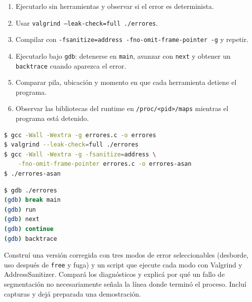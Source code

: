 \documentclass[11pt,a4paper]{article}
\begin{document}
\begin{enumerate}[leftmargin=*]
  \item Ejecutarlo sin herramientas y observar si el error es determinista.
  \item Usar \texttt{valgrind --leak-check=full ./errores}.
  \item Compilar con \texttt{-fsanitize=address -fno-omit-frame-pointer -g}
  y repetir.
  \item Ejecutarlo bajo \texttt{gdb}: detenerse en \texttt{main}, avanzar con
  \texttt{next} y obtener un \texttt{backtrace} cuando aparezca el error.
  \item Comparar pila, ubicación y momento en que cada herramienta detiene el
  programa.
  \item Observar las bibliotecas del runtime en
  \texttt{/proc/<pid>/maps} mientras el programa está detenido.
\end{enumerate}

\begin{lstlisting}[language=bash]
$ gcc -Wall -Wextra -g errores.c -o errores
$ valgrind --leak-check=full ./errores
$ gcc -Wall -Wextra -g -fsanitize=address \
    -fno-omit-frame-pointer errores.c -o errores-asan
$ ./errores-asan
\end{lstlisting}

\begin{lstlisting}[language=bash]
$ gdb ./errores
(gdb) break main
(gdb) run
(gdb) next
(gdb) continue
(gdb) backtrace
\end{lstlisting}

\begin{bonusbox}
Construí una versión corregida con tres modos de error seleccionables
(desborde, uso después de \texttt{free} y fuga) y un script que ejecute cada
modo con Valgrind y AddressSanitizer. Compará los diagnósticos y explicá por
qué un fallo de segmentación no necesariamente señala la línea donde terminó
el proceso. Incluí capturas y dejá preparada una demostración.
\end{bonusbox}
\end{document}
